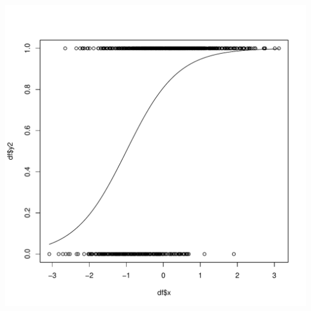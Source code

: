 \documentclass[letterpaper,12pt]{article}\usepackage[]{graphicx}\usepackage[]{color}
\makeatletter
\def\maxwidth{ %
  \ifdim\Gin@nat@width>\linewidth
    \linewidth
  \else
    \Gin@nat@width
  \fi
}
\newenvironment{knitrout}{}{} %
\numberwithin{equation}{section}
\makeatother
\begin{document}
\begin{knitrout}
\includegraphics[width=\maxwidth]{figure/unnamed-chunk-7-2} 

\end{knitrout}
\end{document}
